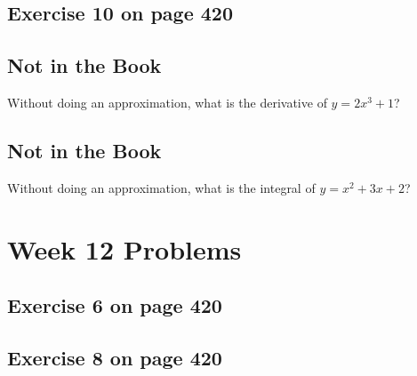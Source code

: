 \documentclass[12pt]{amsart}
\begin{document}
\subsection{Exercise 10 on page 420} 
\subsection{Not in the Book}
Without doing an approximation, what is the derivative of 
$ y = 2x^3+1$?
\subsection{Not in the Book}
Without doing an approximation, what is the integral of  
$y = x^2+3x+2$?

\section{Week 12 Problems}
\subsection{Exercise 6 on page 420}
\subsection{Exercise 8 on page 420}



  
\end{document}
